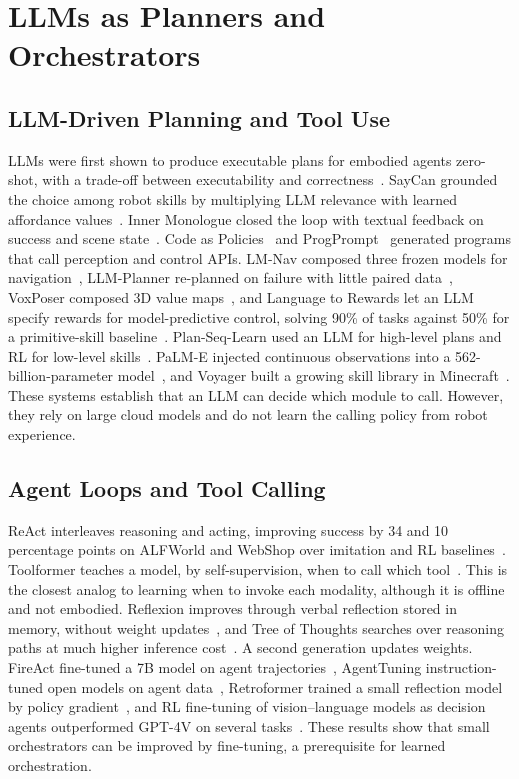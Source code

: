 \documentclass[journal]{IEEEtran}
\begin{document}
\section{LLMs as Planners and Orchestrators}\label{sec:llm}

\subsection{LLM-Driven Planning and Tool Use}\label{sec:llmplan}
LLMs were first shown to produce executable plans for embodied agents zero-shot, with a trade-off between executability and correctness~\cite{Huang2022a}. SayCan grounded the choice among robot skills by multiplying LLM relevance with learned affordance values~\cite{Ahn2022}. Inner Monologue closed the loop with textual feedback on success and scene state~\cite{Huang2022b}. Code as Policies~\cite{Liang2023} and ProgPrompt~\cite{Singh2023} generated programs that call perception and control APIs. LM-Nav composed three frozen models for navigation~\cite{Shah2022}, LLM-Planner re-planned on failure with little paired data~\cite{Song2023}, VoxPoser composed 3D value maps~\cite{Huang2023a}, and Language to Rewards let an LLM specify rewards for model-predictive control, solving 90\% of tasks against 50\% for a primitive-skill baseline~\cite{Yu2023}. Plan-Seq-Learn used an LLM for high-level plans and RL for low-level skills~\cite{Dalal2024}. PaLM-E injected continuous observations into a 562-billion-parameter model~\cite{Driess2023}, and Voyager built a growing skill library in Minecraft~\cite{Wang2024a}. These systems establish that an LLM can decide which module to call. However, they rely on large cloud models and do not learn the calling policy from robot experience.


\subsection{Agent Loops and Tool Calling}\label{sec:agents}
ReAct interleaves reasoning and acting, improving success by 34 and 10 percentage points on ALFWorld and WebShop over imitation and RL baselines~\cite{Yao2023a}. Toolformer teaches a model, by self-supervision, when to call which tool~\cite{Schick2023}. This is the closest analog to learning when to invoke each modality, although it is offline and not embodied. Reflexion improves through verbal reflection stored in memory, without weight updates~\cite{Shinn2023}, and Tree of Thoughts searches over reasoning paths at much higher inference cost~\cite{Yao2023b}. A second generation updates weights. FireAct fine-tuned a 7B model on agent trajectories~\cite{Chen2023b}, AgentTuning instruction-tuned open models on agent data~\cite{Zeng2024}, Retroformer trained a small reflection model by policy gradient~\cite{Yao2024}, and RL fine-tuning of vision--language models as decision agents outperformed GPT-4V on several tasks~\cite{Zhai2024}. These results show that small orchestrators can be improved by fine-tuning, a prerequisite for learned orchestration.
\end{document}
